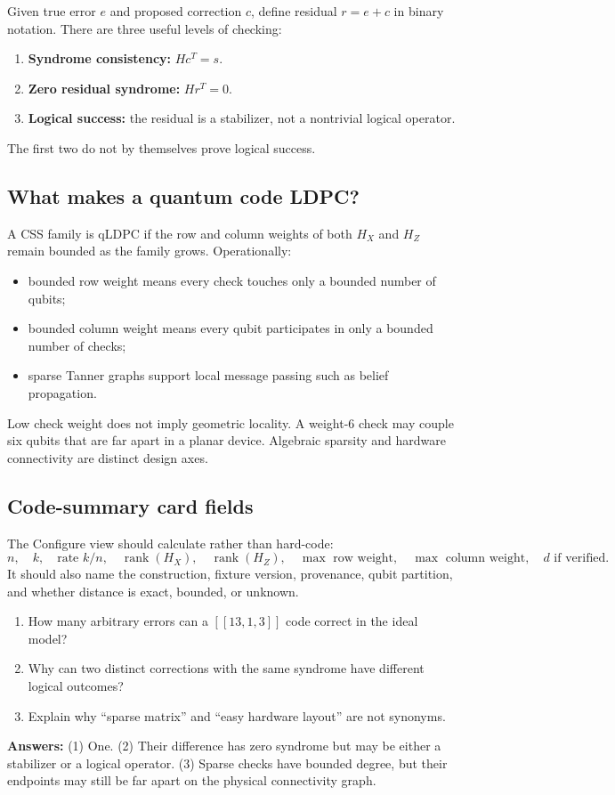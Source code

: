 \documentclass[11pt]{article}
\newcommand{\rank}{\operatorname{rank}}
\begin{document}
Given true error \(e\) and proposed correction \(c\), define residual \(r=e+c\) in binary notation.
There are three useful levels of checking:
\begin{enumerate}
  \item \textbf{Syndrome consistency:} \(Hc^T=s\).
  \item \textbf{Zero residual syndrome:} \(Hr^T=0\).
  \item \textbf{Logical success:} the residual is a stabilizer, not a nontrivial logical operator.
\end{enumerate}
The first two do not by themselves prove logical success.

\subsection{What makes a quantum code LDPC?}

A CSS family is qLDPC if the row and column weights of both \(H_X\) and \(H_Z\) remain bounded as
the family grows. Operationally:
\begin{itemize}
  \item bounded row weight means every check touches only a bounded number of qubits;
  \item bounded column weight means every qubit participates in only a bounded number of checks;
  \item sparse Tanner graphs support local message passing such as belief propagation.
\end{itemize}
Low check weight does not imply geometric locality. A weight-6 check may couple six qubits that are
far apart in a planar device. Algebraic sparsity and hardware connectivity are distinct design axes.

\subsection{Code-summary card fields}

The Configure view should calculate rather than hard-code:
\[
n,\quad k,\quad \text{rate }k/n,\quad \rank(H_X),\quad\rank(H_Z),\quad
\max\text{ row weight},\quad\max\text{ column weight},\quad d\text{ if verified}.
\]
It should also name the construction, fixture version, provenance, qubit partition, and whether
distance is exact, bounded, or unknown.

\begin{masterybox}[title={Day 6 exercises}]
\begin{enumerate}
  \item How many arbitrary errors can a \([[13,1,3]]\) code correct in the ideal model?
  \item Why can two distinct corrections with the same syndrome have different logical outcomes?
  \item Explain why ``sparse matrix'' and ``easy hardware layout'' are not synonyms.
\end{enumerate}
\textbf{Answers:} (1) One. (2) Their difference has zero syndrome but may be either a stabilizer or
a logical operator. (3) Sparse checks have bounded degree, but their endpoints may still be far apart
on the physical connectivity graph.
\end{masterybox}
\end{document}
